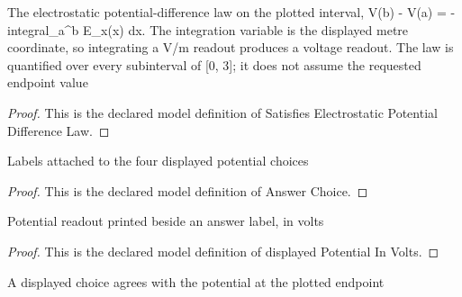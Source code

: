 \begin{definition}
  \label{def:physics:phyx-mini-0869:phyxminiproblems-problemphyxmini0869-satisfieselectrostaticpotentialdifferencelaw}
  The electrostatic potential-difference law on the plotted interval, V(b) - V(a) = - integral\_a\textasciicircum{}b E\_x(x) dx. The integration variable is the displayed metre coordinate, so integrating a V/m readout produces a voltage readout. The law is quantified over every subinterval of [0, 3]; it does not assume the requested endpoint value
\end{definition}
\begin{proof}
  This is the declared model definition of Satisfies Electrostatic Potential Difference Law.
\end{proof}
\begin{definition}
  \label{def:physics:phyx-mini-0869:phyxminiproblems-problemphyxmini0869-answerchoice}
  Labels attached to the four displayed potential choices
\end{definition}
\begin{proof}
  This is the declared model definition of Answer Choice.
\end{proof}
\begin{definition}
  \label{def:physics:phyx-mini-0869:phyxminiproblems-problemphyxmini0869-displayedpotentialinvolts}
  Potential readout printed beside an answer label, in volts
\end{definition}
\begin{proof}
  This is the declared model definition of displayed Potential In Volts.
\end{proof}
\begin{definition}
  \label{def:physics:phyx-mini-0869:phyxminiproblems-problemphyxmini0869-choicematchestarget}
  A displayed choice agrees with the potential at the plotted endpoint
\end{definition}
